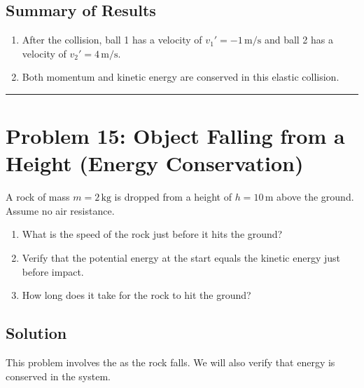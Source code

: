 \documentclass[letterpaper,10pt,english]{jupyterBook}
\begin{document}
\subsection{Summary of Results}
\label{\detokenize{prerequisites:id20}}\begin{enumerate}
%
\item {} 
\sphinxAtStartPar
After the collision, ball 1 has a velocity of \(v_1' = -1 \, \text{m/s}\) and ball 2 has a velocity of \(v_2' = 4 \, \text{m/s}\).

\item {} 
\sphinxAtStartPar
Both momentum and kinetic energy are conserved in this elastic collision.

\end{enumerate}


\bigskip\hrule\bigskip



\section{Problem 15: Object Falling from a Height (Energy Conservation)}
\label{\detokenize{prerequisites:problem-15-object-falling-from-a-height-energy-conservation}}
\sphinxAtStartPar
A rock of mass \(m = 2 \, \text{kg}\) is dropped from a height of \(h = 10 \, \text{m}\) above the ground. Assume no air resistance.
\begin{enumerate}
%
\item {} 
\sphinxAtStartPar
What is the speed of the rock just before it hits the ground?

\item {} 
\sphinxAtStartPar
Verify that the potential energy at the start equals the kinetic energy just before impact.

\item {} 
\sphinxAtStartPar
How long does it take for the rock to hit the ground?

\end{enumerate}


\subsection{Solution}
\label{\detokenize{prerequisites:id21}}
\sphinxAtStartPar
This problem involves the  as the rock falls. We will also verify that energy is conserved in the system.
\end{document}
